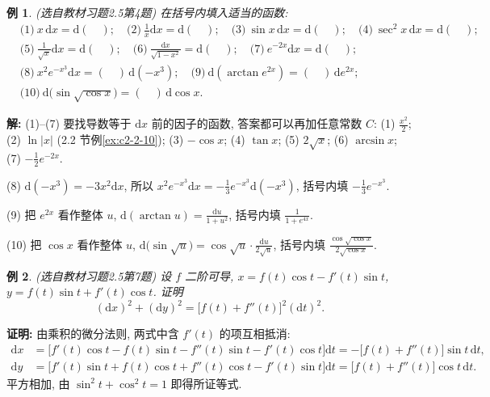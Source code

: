\documentclass[UTF8,openany]{ctexbook}
\theoremstyle{chinesetextbook}
\newtheorem{example}{例}[section]
\newenvironment{cnproof}{\par\indent\textbf{证明:} \ignorespaces}{\par}
\newenvironment{cnsolution}{\par\indent\textbf{解:} \ignorespaces}{\par}
\newcommand{\dd}{\mathrm d}
\begin{document}
\begin{example}\label{ex:c2-h5-4}
\textnormal{(选自教材习题2.5第4题)} 在括号内填入适当的函数:
\[
\begin{aligned}
&\text{(1)}\ x\,\dd x=\dd(\quad);\quad\text{(2)}\ \frac1x\dd x=\dd(\quad);\quad\text{(3)}\ \sin x\,\dd x=\dd(\quad);\quad\text{(4)}\ \sec^2x\,\dd x=\dd(\quad);\\
&\text{(5)}\ \frac1{\sqrt x}\dd x=\dd(\quad);\quad\text{(6)}\ \frac{\dd x}{\sqrt{1-x^2}}=\dd(\quad);\quad\text{(7)}\ e^{-2x}\dd x=\dd(\quad);\\
&\text{(8)}\ x^2e^{-x^3}\dd x=(\quad)\,\dd(-x^3);\quad\text{(9)}\ \dd(\arctan e^{2x})=(\quad)\,\dd e^{2x};\\
&\text{(10)}\ \dd\bigl(\sin\sqrt{\cos x}\bigr)=(\quad)\,\dd\cos x.
\end{aligned}
\]
\end{example}
\begin{cnsolution}
(1)–(7) 要找导数等于 $\dd x$ 前的因子的函数, 答案都可以再加任意常数 $C$: (1) $\displaystyle\frac{x^2}2$; (2) $\ln|x|$ (2.2 节例\ref{ex:c2-2-10}); (3) $-\cos x$; (4) $\tan x$; (5) $2\sqrt x$; (6) $\arcsin x$; (7) $\displaystyle-\frac12e^{-2x}$.

(8) $\dd(-x^3)=-3x^2\dd x$, 所以 $\displaystyle x^2e^{-x^3}\dd x=-\frac13e^{-x^3}\dd(-x^3)$, 括号内填 $\displaystyle-\frac13e^{-x^3}$.

(9) 把 $e^{2x}$ 看作整体 $u$, $\displaystyle\dd(\arctan u)=\frac{\dd u}{1+u^2}$, 括号内填 $\displaystyle\frac1{1+e^{4x}}$.

(10) 把 $\cos x$ 看作整体 $u$, $\displaystyle\dd\bigl(\sin\sqrt u\bigr)=\cos\sqrt u\cdot\frac{\dd u}{2\sqrt u}$, 括号内填 $\displaystyle\frac{\cos\sqrt{\cos x}}{2\sqrt{\cos x}}$.
\end{cnsolution}
\begin{example}\label{ex:c2-h5-7}
\textnormal{(选自教材习题2.5第7题)} 设 $f$ 二阶可导, $x=f(t)\cos t-f'(t)\sin t$, $y=f(t)\sin t+f'(t)\cos t$. 证明
\[
(\dd x)^2+(\dd y)^2=\bigl[f(t)+f''(t)\bigr]^2(\dd t)^2.
\]
\end{example}
\begin{cnproof}
由乘积的微分法则, 两式中含 $f'(t)$ 的项互相抵消:
\[
\begin{aligned}
\dd x&=\bigl[f'(t)\cos t-f(t)\sin t-f''(t)\sin t-f'(t)\cos t\bigr]\dd t=-\bigl[f(t)+f''(t)\bigr]\sin t\,\dd t,\\
\dd y&=\bigl[f'(t)\sin t+f(t)\cos t+f''(t)\cos t-f'(t)\sin t\bigr]\dd t=\bigl[f(t)+f''(t)\bigr]\cos t\,\dd t.
\end{aligned}
\]
平方相加, 由 $\sin^2t+\cos^2t=1$ 即得所证等式.
\end{cnproof}
\end{document}
